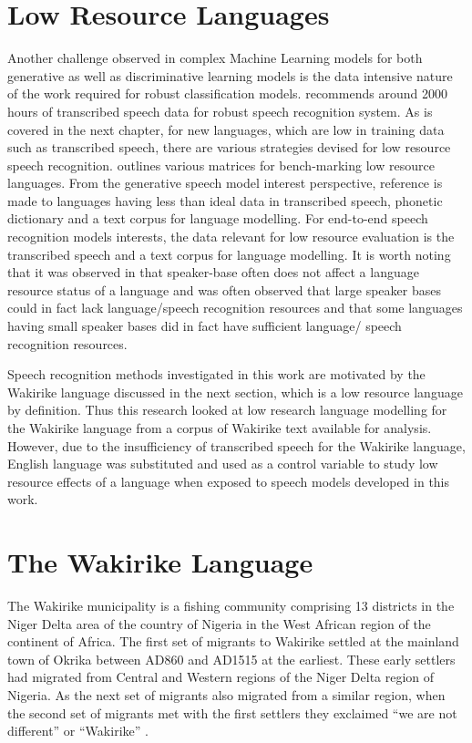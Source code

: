 \section{Low Resource Languages}
Another challenge observed in complex Machine Learning models for both generative as well as discriminative learning models is the data intensive nature of the work required for robust classification models. \cite{saon2015ibm} recommends around 2000 hours of transcribed speech data for robust speech recognition system. As is covered in the next chapter, for new languages, which are low in training data such as transcribed speech, there are various strategies devised for low resource speech recognition. \cite{besacier2014automatic} outlines various matrices for bench-marking low resource languages.  From the generative speech model interest perspective,  reference is made to languages having less than ideal data in transcribed speech, phonetic dictionary and a text corpus for language modelling.  For end-to-end speech recognition models interests, the data relevant for low resource evaluation is the transcribed speech and a text corpus for language modelling.  It is worth noting that it was observed in \cite{besacier2014automatic} that speaker-base often does not affect a language resource status of a language and was often observed that large speaker bases could in fact lack language/speech recognition resources and that some languages having small speaker bases did in fact have sufficient language/ speech recognition resources.

Speech recognition methods investigated in this work are motivated by the Wakirike language discussed in the next section, which is a low resource language by definition.  Thus this research looked at low research language modelling for the Wakirike language from a corpus of Wakirike text available for analysis.  However, due to the insufficiency of transcribed speech for the Wakirike language, English language was substituted and used as a control variable to study low resource effects of a language when exposed to speech models developed in this work.

\section{The Wakirike Language}
The Wakirike municipality is a fishing community comprising 13 districts in the Niger Delta area of the country of Nigeria in the West African region of the continent of Africa. The first set of migrants to Wakirike settled at the mainland town of Okrika between AD860 and AD1515 at the earliest.  These early settlers had migrated from Central and Western regions of the Niger Delta region of Nigeria.  As the next set of migrants also migrated from a similar region, when the second set of migrants met with the first settlers they exclaimed “we are not different” or “Wakirike” \citep{wakirike}.  

